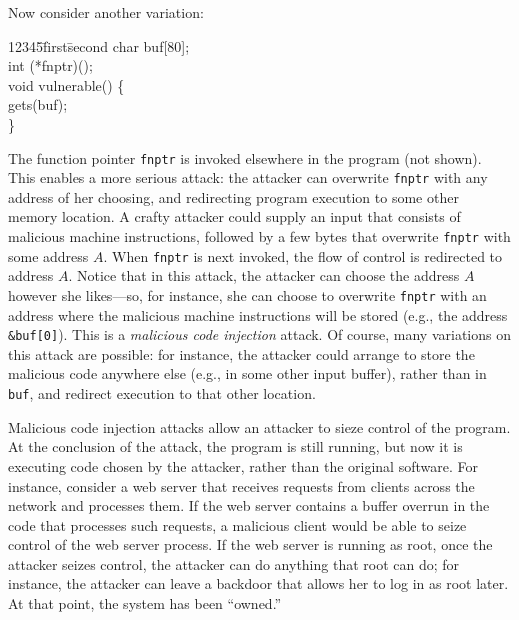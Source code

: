 \documentclass[11pt]{article}
\begin{document}
Now consider another variation:

\begin{ttfamily}
\begin{tabbing}
12345\=first\=second \kill
char buf[80]; \\
int (*fnptr)(); \\
void vulnerable() \{ \\
\>gets(buf);\\
\}\\
\end{tabbing}
\end{ttfamily}

The function pointer \texttt{fnptr} is invoked elsewhere in the program (not
shown). This enables a more serious attack: the attacker can overwrite
\texttt{fnptr} with any address of her choosing, and redirecting program execution 
to some other memory location. A crafty attacker could supply
an input that consists of malicious machine instructions, followed by
a few bytes that overwrite \texttt{fnptr} with some address $A$.  When 
\texttt{fnptr} is next invoked, the flow of control is redirected to address $A$. Notice
that in this attack, the attacker can choose the address $A$ however she
likes---so, for instance, she can choose to overwrite \texttt{fnptr} with an
address where the malicious machine instructions will be stored (e.g.,
the address \texttt{\&buf[0]}). This is a \textit{malicious code injection} attack. 
Of course, many variations on this attack are possible: for instance, the
attacker could arrange to store the malicious code anywhere else
(e.g., in some other input buffer), rather than in \texttt{buf}, and redirect
execution to that other location.  

Malicious code injection attacks
allow an attacker to sieze control of the program. At the conclusion
of the attack, the program is still running, but now it is executing
code chosen by the attacker, rather than the original software. For
instance, consider a web server that receives requests from clients
across the network and processes them. If the web server contains a
buffer overrun in the code that processes such requests, a malicious
client would be able to seize control of the web server process. If
the web server is running as root, once the attacker seizes control,
the attacker can do anything that root can do; for instance, the
attacker can leave a backdoor that allows her to log in as root
later. At that point, the system has been ``owned.''
\end{document}
